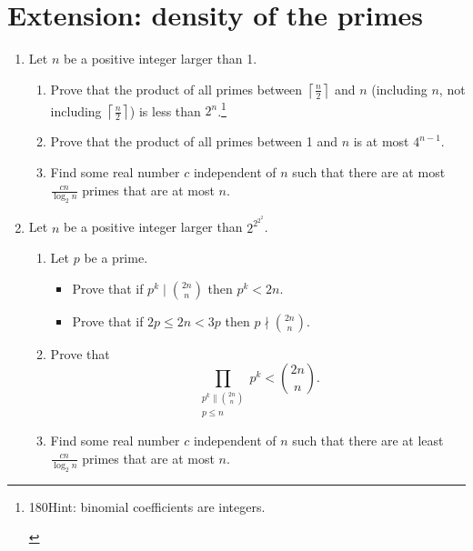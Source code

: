\documentclass{article}
\begin{document}
\section{Extension: density of the primes}
\begin{enumerate}
  \item
    Let $n$ be a positive integer larger than 1.
    \begin{enumerate}
      \item Prove that the product of all primes between $\left\lceil\frac
        n2\right\rceil$ and $n$
        (including $n$, not including $\left\lceil\frac n2\right\rceil$)
        is less than
        $2^n$.\footnote{\begin{turn}{180}Hint: binomial coefficients are
        integers.\end{turn}}
      \item Prove that the product of all primes between 1 and $n$ is at most
        $4^{n-1}$.
      \item Find some real number $c$ independent of $n$ such that there are at
        most $\frac{cn}{\log_2 n}$ primes that are at most $n$.
    \end{enumerate}
  \item 
    Let $n$ be a positive integer larger than $2^{2^{2^2}}$.
    \begin{enumerate}
      \item Let $p$ be a prime.
        \begin{itemize}
          \item Prove that if $p^k\mid\binom{2n}n$ then $p^k<
            2n$.
          \item Prove that if $2p\le 2n< 3p$ then $p\nmid\binom{2n}n$.
        \end{itemize}
      \item Prove that 
        \[\prod_{\substack{p^k\|\binom{2n}n\\ p\le n}}p^k<\binom{2n}n.\]
      \item Find some real number $c$ independent of $n$ such that there are at
        least $\frac{cn}{\log_2 n}$ primes that are at most $n$.
    \end{enumerate} 
\end{enumerate}
\end{document}
